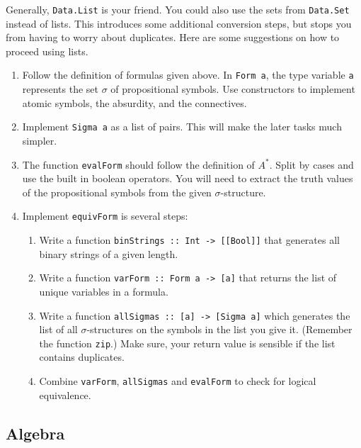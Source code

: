 \documentclass{article}[12pt]
\theoremstyle{definition}
\begin{document}
Generally, \verb|Data.List| is your friend. You could also use the sets from \verb|Data.Set| instead of lists. This introduces some additional conversion steps, but stops you from having to worry about duplicates. Here are some suggestions on how to proceed using lists. 
\begin{enumerate}
    \item Follow the definition of formulas given above. In \verb|Form a|, the type variable \verb|a| represents the set $\sigma$ of propositional symbols. Use constructors to implement atomic symbols, the absurdity, and the connectives.
    \item Implement \verb|Sigma a| as a list of pairs. This will make the later tasks much simpler.
    \item The function \verb|evalForm| should follow the definition of $A^*$. Split by cases and use the built in boolean operators. You will need to extract the truth values of the propositional symbols from the given $\sigma$-structure.
    \item Implement \verb|equivForm| is several steps:
    \begin{enumerate}
        \item Write a function \verb|binStrings :: Int -> [[Bool]]| that generates all binary strings of a given length. 
        \item Write a function \verb|varForm :: Form a -> [a]| that returns the list of unique variables in a formula. 
        \item Write a function \verb|allSigmas :: [a] -> [Sigma a]| which generates the list of all $\sigma$-structures on the symbols in the list you give it. (Remember the function \verb|zip|.) Make sure, your return value is sensible if the list contains duplicates.
        \item Combine \verb|varForm|, \verb|allSigmas| and \verb|evalForm| to check for logical equivalence.
    \end{enumerate}
\end{enumerate}

\subsection{Algebra}
\noindent{}
\end{document}

